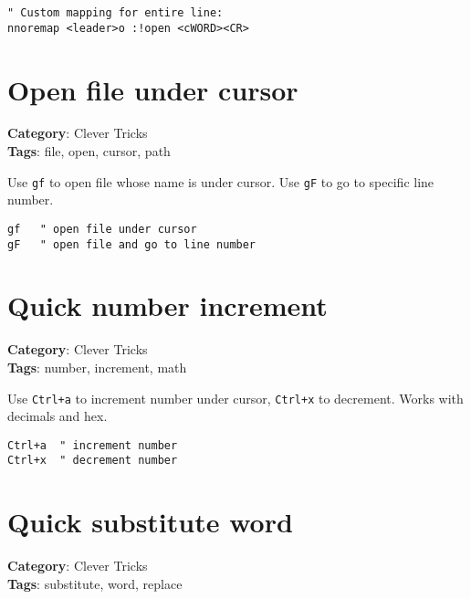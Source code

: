 {{{\begin{Exa*}{}
\begin{Verbatim}[fontsize=\footnotesize, breaklines, breakanywhere]
" Custom mapping for entire line:
nnoremap <leader>o :!open <cWORD><CR>
\end{Verbatim}
\end{Exa*}

\section{Open file under cursor}

\textbf{Category}: Clever Tricks\\ \textbf{Tags}: file, open, cursor, path
\vspace{0.5cm}

Use {\footnotesize \Verb§gf§} to open file whose name is under cursor. Use {\footnotesize \Verb§gF§} to go to specific line number.

\begin{Exa*}{}
\begin{Verbatim}[fontsize=\footnotesize, breaklines, breakanywhere]
gf   " open file under cursor
gF   " open file and go to line number
\end{Verbatim}
\end{Exa*}

\section{Quick number increment}

\textbf{Category}: Clever Tricks\\ \textbf{Tags}: number, increment, math
\vspace{0.5cm}

Use {\footnotesize \Verb§Ctrl+a§} to increment number under cursor, {\footnotesize \Verb§Ctrl+x§} to decrement. Works with decimals and hex.

\begin{Exa*}{}
\begin{Verbatim}[fontsize=\footnotesize, breaklines, breakanywhere]
Ctrl+a  " increment number
Ctrl+x  " decrement number
\end{Verbatim}
\end{Exa*}

\section{Quick substitute word}

\textbf{Category}: Clever Tricks\\ \textbf{Tags}: substitute, word, replace
\vspace{0.5cm}

}}}
